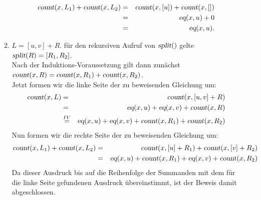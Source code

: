 \documentclass{article}
\begin{document}
\begin{enumerate}
\begin{enumerate}
\begin{eqnarray*}
                  \textsl{count}(x,L_1) + \textsl{count}(x,L_2) 
            & = & \textsl{count}(x,[u]) + \textsl{count}(x,[]) \\
            & = & \textsl{eq}(x,u) + 0 \\
            & = & \textsl{eq}(x,u).
            \end{eqnarray*}
      \item $L = [u,v] + R$.  f\"ur den rekursiven Aufruf von $\textsl{split}()$ gelte
            \\[0.2cm]
            \hspace*{1.3cm}
            $\textsl{split}(R) = [R_1, R_2]$.
            \\[0.2cm]
            Nach der Induktions-Voraussetzung gilt dann zun\"achst
            \\[0.2cm]
            \hspace*{1.3cm}
            $\textsl{count}(x,R) = \textsl{count}(x, R_1) + \textsl{count}(x, R_2)$.
            \\[0.2cm]
            Jetzt formen wir die linke Seite der zu beweisenden Gleichung um:
            \begin{eqnarray*}
                    \textsl{count}(x,L)
              & = & \textsl{count}(x,[u,v] + R) \\
              & = & \textsl{eq}(x,u) + \textsl{eq}(x,v) + \textsl{count}(x,R) \\
              & \stackrel{IV}{=} & \textsl{eq}(x,u) + \textsl{eq}(x,v) + 
                \textsl{count}(x,R_1) + \textsl{count}(x,R_2) 
            \end{eqnarray*}
            Nun formen wir die rechte Seite der zu beweisenden Gleichung um:
            \begin{eqnarray*}
                    \textsl{count}(x,L_1) + \textsl{count}(x,L_2)
              & = & \textsl{count}(x,[u] + R_1) + \textsl{count}(x, [v] + R_2) \\
              & = & \textsl{eq}(x,u) + \textsl{count}(x,R_1) + \textsl{eq}(x,v) + \textsl{count}(x, R_2) 
            \end{eqnarray*}
            Da dieser Ausdruck bis auf die Reihenfolge der Summanden mit dem f\"ur die linke Seite
            gefundenen Ausdruck \"ubereinstimmt, ist der Beweis damit abgeschlossen.
      \end{enumerate}
\end{enumerate}
\vspace{0.3cm}
\end{document}
